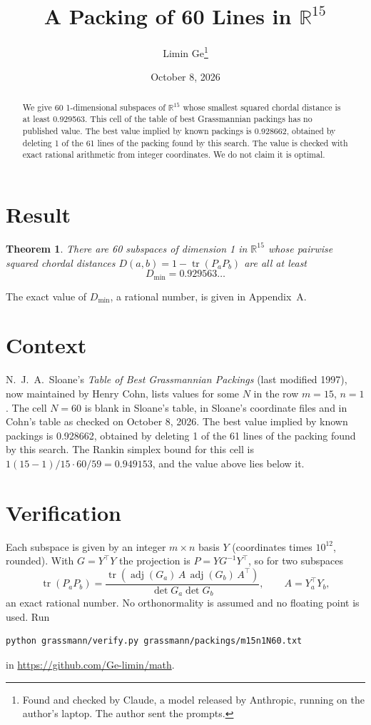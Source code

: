 \documentclass[11pt,a4paper]{article}
\title{A Packing of 60 Lines in $\mathbb{R}^{15}$}
\author{Limin Ge\thanks{Found and checked by Claude, a model released by Anthropic, running on the author's laptop. The author sent the prompts.}}
\date{October 8, 2026}
\newtheorem*{theorem}{Theorem}
\begin{document}
\maketitle
\begin{abstract}
We give 60 1-dimensional subspaces of $\mathbb{R}^{15}$ whose smallest squared chordal distance is at least 0.929563. This cell of the table of best Grassmannian packings has no published value. The best value implied by known packings is 0.928662, obtained by deleting 1 of the 61 lines of the packing found by this search. The value is checked with exact rational arithmetic from integer coordinates. We do not claim it is optimal.
\end{abstract}

\section{Result}
\begin{theorem}
There are 60 subspaces of dimension 1 in $\mathbb{R}^{15}$ whose pairwise squared chordal distances $D(a,b) = 1 - \operatorname{tr}(P_aP_b)$ are all at least
\[ D_{\min} = 0.929563\ldots \]
\end{theorem}
The exact value of $D_{\min}$, a rational number, is given in Appendix~A.


\section{Context}
N.~J.~A.~Sloane's \emph{Table of Best Grassmannian Packings} (last modified 1997), now maintained by Henry Cohn, lists values for some $N$ in the row $m=15$, $n=1$. The cell $N=60$ is blank in Sloane's table, in Sloane's coordinate files and in Cohn's table as checked on October 8, 2026. The best value implied by known packings is 0.928662, obtained by deleting 1 of the 61 lines of the packing found by this search. The Rankin simplex bound for this cell is $1(15-1)/15\cdot 60/59 = 0.949153$, and the value above lies below it.


\section{Verification}
Each subspace is given by an integer $m\times n$ basis $Y$ (coordinates times $10^{12}$, rounded). With $G=Y^\top Y$ the projection is $P=YG^{-1}Y^\top$, so for two subspaces
\[ \operatorname{tr}(P_aP_b)=\frac{\operatorname{tr}(\operatorname{adj}(G_a)\,A\,\operatorname{adj}(G_b)\,A^\top)}{\det G_a\det G_b},\qquad A=Y_a^\top Y_b, \]
an exact rational number. No orthonormality is assumed and no floating point is used. Run
\begin{verbatim}
python grassmann/verify.py grassmann/packings/m15n1N60.txt
\end{verbatim}
in \url{https://github.com/Ge-limin/math}.
\end{document}
